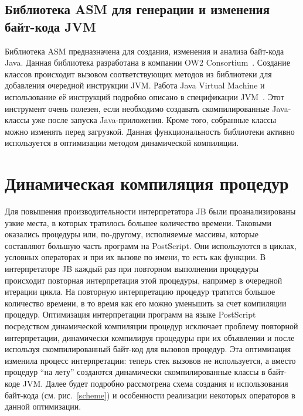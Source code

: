 	\subsection{Библиотека ASM для генерации и изменения байт-кода JVM}
	Библиотека ASM предназначена для создания, изменения и анализа байт-кода Java. Данная библиотека разработана в компании OW2 Consortium~\cite{ow2-site}. Создание классов происходит вызовом соответствующих методов из библиотеки для добавления очередной инструкции JVM. Работа Java Virtual Machine и использование её инструкций подробно описано в спецификации JVM~\cite{jvms}. Этот инструмент очень полезен, если необходимо создавать скомпилированные Java-классы уже после запуска Java-приложения.  Кроме того, собранные классы можно изменять перед загрузкой. Данная функциональность библиотеки активно используется в оптимизации методом динамической компиляции. 


	
	\section{Динамическая компиляция процедур}
	Для повышения производительности интерпретатора JB были проанализированы узкие места, в которых тратилось большее количество времени. Таковыми оказались процедуры или, по-другому, исполняемые массивы, которые составляют большую часть программ на PostScript. Они используются в циклах, условных операторах и при их вызове по имени, то есть как функции.  
	В интерпретаторе JB каждый раз при повторном выполнении процедуры происходит повторная интерпретация этой процедуры, например в очередной итерации цикла. На повторную интерпретацию процедур тратится большое количество времени, в то время как его можно уменьшить за счет компиляции процедур.
	Оптимизация интерпретации программ на языке PostScript посредством динамической компиляции процедур исключает проблему повторной интерпретации, динамически компилируя процедуры при их объявлении и после используя скомпилированный байт-код для вызовов процедур.  	
	Эта оптимизация изменила процесс интерпретации: теперь стек вызовов не используется, а вместо процедур ``на лету'' создаются динамически скомпилированные классы в байт-коде JVM. Далее будет подробно рассмотрена схема создания и использования байт-кода (см. рис.~\ref{scheme}) и особенности реализации некоторых операторов в данной оптимизации.
	
